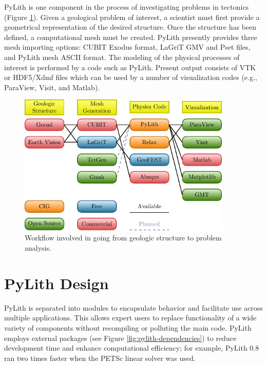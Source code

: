 PyLith is one component in the process of investigating problems in
tectonics (Figure \ref{fig:Workflow-summary}). Given a geological
problem of interest, a scientist must first provide a geometrical
representation of the desired structure. Once the structure has been
defined, a computational mesh must be created. PyLith presently provides
three mesh importing options: CUBIT Exodus format, LaGriT GMV and
Pset files, and PyLith mesh ASCII format. The modeling of the physical
processes of interest is performed by a code such as PyLith. Present
output consists of VTK or HDF5/Xdmf files which can be used by a number
of visualization codes (e.g., ParaView, Visit, and Matlab). 

\begin{figure}[H]
\begin{centering}
\includegraphics[width=4in]{intro/figs/workflow}
\par\end{centering}

\caption{\label{fig:Workflow-summary}Workflow involved in going from geologic
structure to problem analysis.}
\end{figure}



\section{PyLith Design}

PyLith is separated into modules to encapsulate behavior and facilitate
use across multiple applications. This allows expert users to replace
functionality of a wide variety of components without recompiling
or polluting the main code. PyLith employs external packages (see
Figure \ref{fig:pylith-dependencies}) to reduce development time
and enhance computational efficiency; for example, PyLith 0.8 ran
two times faster when the PETSc linear solver was used.

